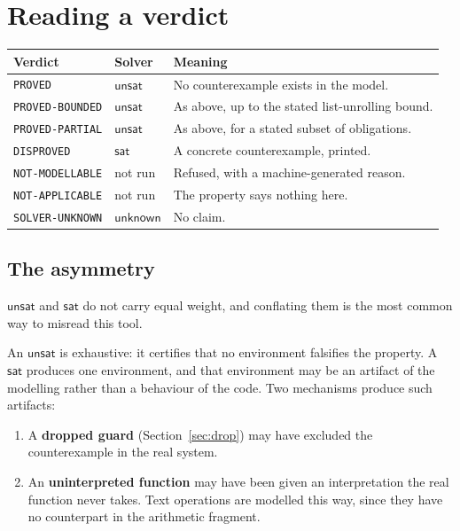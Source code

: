 \documentclass[11pt,a4paper]{article}
\newcommand{\unsat}{\mathsf{unsat}}
\newcommand{\sat}{\mathsf{sat}}
\newcommand{\unknown}{\mathsf{unknown}}
\newcommand{\code}[1]{\texttt{#1}}
\theoremstyle{definition}
\theoremstyle{plain}
\theoremstyle{remark}
\begin{document}
\section{Reading a verdict}

\begin{center}
\begin{tabular}{@{}lll@{}}
\toprule
Verdict & Solver & Meaning \\
\midrule
\code{PROVED}          & $\unsat$   & No counterexample exists in the model. \\
\code{PROVED-BOUNDED}  & $\unsat$   & As above, up to the stated list-unrolling bound. \\
\code{PROVED-PARTIAL}  & $\unsat$   & As above, for a stated subset of obligations. \\
\code{DISPROVED}       & $\sat$     & A concrete counterexample, printed. \\
\code{NOT-MODELLABLE}  & not run    & Refused, with a machine-generated reason. \\
\code{NOT-APPLICABLE}  & not run    & The property says nothing here. \\
\code{SOLVER-UNKNOWN}  & $\unknown$ & No claim. \\
\bottomrule
\end{tabular}
\end{center}

\subsection{The asymmetry}

$\unsat$ and $\sat$ do not carry equal weight, and conflating them is the most
common way to misread this tool.

An $\unsat$ is exhaustive: it certifies that no environment falsifies the
property. A $\sat$ produces one environment, and that environment may be an
artifact of the modelling rather than a behaviour of the code. Two mechanisms
produce such artifacts:

\begin{enumerate}
  \item A \textbf{dropped guard} (Section~\ref{sec:drop}) may have excluded the
        counterexample in the real system.
  \item An \textbf{uninterpreted function} may have been given an
        interpretation the real function never takes. Text operations are
        modelled this way, since they have no counterpart in the arithmetic
        fragment.
\end{enumerate}
\end{document}
